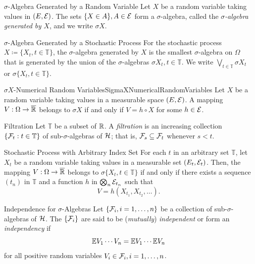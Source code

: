 \begin{defn}{\(\sigma\)-Algebra Generated by a Random Variable}{}
	Let \(X\) be a random variable taking values in \((E, \mathcal{E})\). The sets \(\{X \in A\}, A \in \mathcal{E}\) form a \(\sigma\)-algebra, called the \textit{\(\sigma\)-algebra generated by \(X\)}, and we write \(\sigma X\).
\end{defn}

\begin{thm}{\(\sigma\)-Algebra Generated by a Stochastic Process}{}
	For the stochastic process \(X \coloneqq \{X_t, t \in \mathbb{T}\}\), the \(\sigma\)-algebra generated by \(X\) is the smallest \(\sigma\)-algebra on \(\Omega\) that is generated by the union of the \(\sigma\)-algebras \(\sigma X_t, t \in \mathbb{T}\). We write \(\bigvee_{t \in \mathbb{T}} \sigma X_t\) or \(\sigma \{X_t, t \in \mathbb{T}\}\).
\end{thm}

\begin{thm}{\(\sigma X\)-Numerical Random Variables}{SigmaXNumericalRandomVariables}
	Let \(X\) be a random variable taking values in a measurable space \((E, \mathcal{E})\). A mapping \(V : \Omega \to \overline{\mathbb{R}}\) belongs to \(\sigma X\) if and only if \(V = h \circ X\) for some \(h \in \mathcal{E}\).
\end{thm}

\begin{defn}{Filtration}{}
	Let \(\mathbb{T}\) be a subset of \(\mathbb{R}\). A \textit{filtration} is an increasing collection \(\{\mathcal{F}_t : t \in \mathbb{T}\}\) of sub-\(\sigma\)-algebras of \(\mathcal{H}\); that is, \(\mathcal{F}_s \subseteq \mathcal{F}_t\) whenever \(s < t\).
\end{defn}

\begin{thm}{Stochastic Process with Arbitrary Index Set}{}
	For each \(t\) in an arbitrary set \(\mathbb{T}\), let \(X_t\) be a random variable taking values in a measurable set \((E_t, \mathcal{E}_t)\). Then, the mapping \(V : \Omega \to \overline{\mathbb{R}}\) belongs to \(\sigma\{X_t, t \in \mathbb{T}\}\) if and only if there exists a sequence \((t_n)\) in \(\mathbb{T}\) and a function \(h\) in \(\bigotimes_{n} \mathcal{E}_{t_n}\) such that
	\begin{equation*}
		V = h(X_{t_1}, X_{t_2}, \dots).
	\end{equation*}
\end{thm}

\begin{defn}{Independence for \(\sigma\)-Algebras}{}
	Let \(\{\mathcal{F}_i, i = 1, \dots, n\}\) be a collection of sub-\(\sigma\)-algebras of \(\mathcal{H}\). The \(\{\mathcal{F}_i\}\) are said to be (\textit{mutually}) \textit{independent} or form an \textit{independency} if
	\begin{equation}
		\mathbb{E} V_1 \cdots V_n = \mathbb{E} V_1 \cdots \mathbb{E} V_n
		\label{eq:SigmaAlgebraIndependenceDef}
	\end{equation}
	for all positive random variables \(V_i \in \mathcal{F}_i, i = 1, \dots, n\).
\end{defn}

